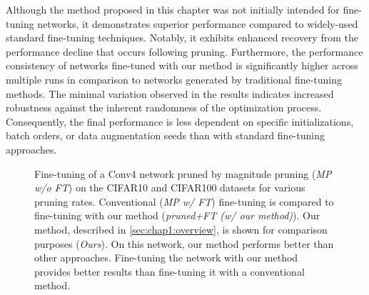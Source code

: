 Although the method proposed in this chapter was not initially intended for
fine-tuning networks, it demonstrates superior performance compared to
widely-used standard fine-tuning techniques. Notably, it exhibits enhanced
recovery from the performance decline that occurs following pruning.
Furthermore, the performance consistency of networks fine-tuned with our method
is significantly higher across multiple runs in comparison to networks generated
by traditional fine-tuning methods. The minimal variation observed in the
results indicates increased robustness against the inherent randomness of the
optimization process. Consequently, the final performance is less dependent on
specific initializations, batch orders, or data augmentation seeds than with
standard fine-tuning approaches.\\


\begin{figure}
  \centering
  \caption{ Fine-tuning of a Conv4 network pruned by magnitude pruning (\emph{MP
      w/o FT}) on the CIFAR10 and CIFAR100 datasets for various pruning rates.
    Conventional (\emph{MP w/ FT}) fine-tuning is compared to fine-tuning with our
    method (\emph{pruned+FT (w/ our method)}). Our method, described in
    \cref{sec:chap1:overview}, is shown for comparison purposes (\emph{Ours}). On
    this network, our method performs better than other approaches. Fine-tuning
    the network with our method provides better results than fine-tuning it with a
    conventional method.}
  \label{fig:chap1:finetuning_impact_conv4}
\end{figure}


